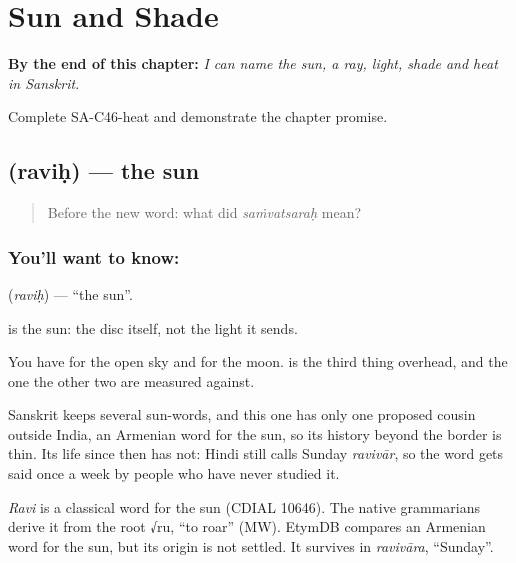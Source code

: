 
\chapter{Sun and Shade}
\label{ch:sa-sun-and-shade}

\begin{chapteropening}
\textbf{By the end of this chapter:} \emph{I can name the sun, a ray, light, shade and heat in Sanskrit.}

Complete SA-C46-heat and demonstrate the chapter promise.
\end{chapteropening}

\section[\texorpdfstring{\sk{रविः} (raviḥ)}{रविः (raviḥ)}]{ (raviḥ) — the sun}

\label{lesson:SA-C46-sun}



\begin{quote}
Before the new word: what did \emph{saṁvatsaraḥ} mean?
\end{quote}

\subsection*{You'll want to know: }
\textbf{} (\emph{raviḥ}) — \textquotedblleft{}the sun\textquotedblright{}.

\textbf{} is the sun: the disc itself, not the light it sends.

You have  for the open sky and  for the moon. \textbf{} is the third thing overhead, and the one the other two are measured against.

Sanskrit keeps several sun-words, and this one has only one proposed cousin outside India, an Armenian word for the sun, so its history beyond the border is thin. Its life since then has not: Hindi still calls Sunday \emph{ravivār}, so the word gets said once a week by people who have never studied it.

\begin{cousinweb}
\emph{Ravi} is a classical word for the sun (CDIAL 10646). The native grammarians derive it from the root √ru, \textquotedblleft{}to roar\textquotedblright{} (MW). EtymDB compares an Armenian word for the sun, but its origin is not settled. It survives in \emph{ravivāra}, \textquotedblleft{}Sunday\textquotedblright{}.
\end{cousinweb}

